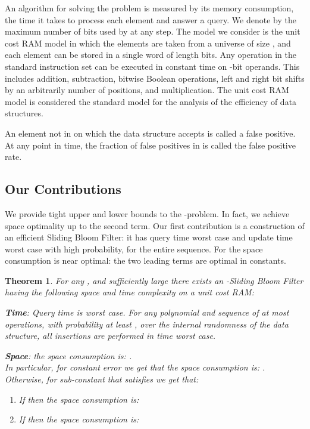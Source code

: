 \documentclass[11pt]{article}
\newtheorem{theorem}{Theorem}[section]
\begin{document}
An algorithm  for solving the problem is measured by its memory consumption, the time it takes to process each element and answer a query. We denote by  the maximum number of bits used by  at any step. The model we consider is the unit cost RAM model in which the elements are taken from a universe of size , and each element can be stored in a single word of length  bits. Any operation in the standard instruction set can be executed in constant time on -bit operands. This includes addition, subtraction, bitwise Boolean operations, left and right bit shifts by an arbitrarily number of positions, and multiplication. The unit cost RAM model is considered the standard model for the analysis of the efficiency of data structures.

An element not in  on which the data structure accepts is called a false positive. At any point in time, the fraction of false positives in  is called the false positive rate.

\subsection{Our Contributions}
\label{sec:our}
We provide tight upper and lower bounds to the -problem. In fact, we achieve space optimality up to the second term. Our first contribution is a construction of an efficient Sliding Bloom Filter: it has query time  worst case and update time  worst case with high probability, for the entire sequence. For  the space consumption is near optimal: the two leading terms are optimal in constants.

\begin{theorem}\label{UpperBoundNumber}
For any , and sufficiently large  there exists an -Sliding Bloom Filter having the following space and time complexity on a unit cost RAM:

\begin{description}
\item \textbf{Time}: Query time is  worst case. For any polynomial  and sequence of at most  operations, with probability at least , over the internal randomness of the data structure, all insertions are performed in time  worst case.
\item
\textbf{Space}: the space consumption is: .\\
In particular, for constant error  we get that the space consumption is: . Otherwise, for sub-constant  that satisfies  we get that:
\begin{enumerate}
\item If   then the space consumption is: 
\item If  then the space consumption is: 
\end{enumerate}
\end{description}

\end{theorem}
\end{document}
